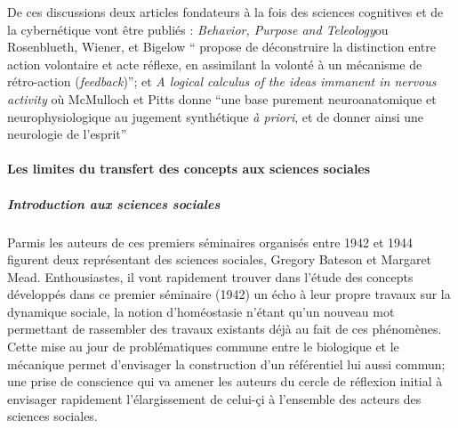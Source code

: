 De ces discussions deux articles fondateurs à la fois des sciences cognitives \autocite[23]{Dupuy2000} et de la cybernétique vont être publiés : \textit{Behavior, Purpose and Teleology}ou Rosenblueth, Wiener, et Bigelow \enquote{ propose de déconstruire la distinction entre action volontaire et acte réflexe, en assimilant la volonté à un mécanisme de rétro-action (\textit{feedback})}; et \textit{A logical calculus of the ideas immanent in nervous activity} où McMulloch et Pitts donne \enquote{une base purement neuroanatomique et neurophysiologique au jugement synthétique \textit{à priori}, et de donner ainsi une neurologie de l'esprit}

\paragraph{ Les limites du transfert des concepts aux sciences sociales}

\subparagraph{Introduction aux sciences sociales}
Parmis les auteurs de ces premiers séminaires organisés entre 1942 et 1944 figurent deux représentant des sciences sociales, Gregory Bateson et Margaret Mead. Enthousiastes, il vont rapidement trouver dans l'étude des concepts développés dans ce premier séminaire (1942) un écho à leur propre travaux sur la dynamique sociale, la notion d'homéostasie n'étant qu'un nouveau mot permettant de rassembler des travaux existants déjà au fait de ces phénomènes. Cette mise au jour de problématiques commune entre le biologique et le mécanique permet d'envisager la construction d'un référentiel lui aussi commun; une prise de conscience qui va amener les auteurs du cercle de réflexion initial à envisager rapidement l'élargissement de celui-çi à l'ensemble des acteurs des sciences sociales.

